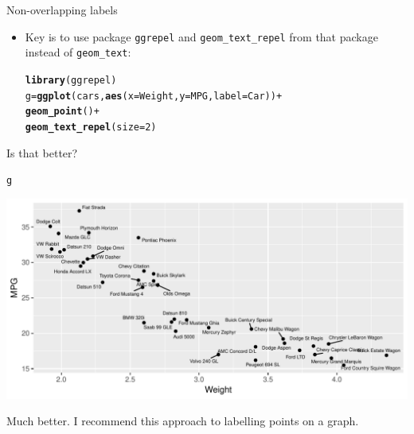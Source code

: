 \documentclass[unknownkeysallowed]{beamer}\usepackage[]{graphicx}\usepackage[]{color}
\makeatletter
\def\maxwidth{ %
  \ifdim\Gin@nat@width>\linewidth
    \linewidth
  \else
    \Gin@nat@width
  \fi
}
\newcommand{\hlnum}[1]{\textcolor[rgb]{0.686,0.059,0.569}{#1}}%
\newcommand{\hlopt}[1]{\textcolor[rgb]{0,0,0}{#1}}%
\newcommand{\hlstd}[1]{\textcolor[rgb]{0.345,0.345,0.345}{#1}}%
\newcommand{\hlkwb}[1]{\textcolor[rgb]{0.69,0.353,0.396}{#1}}%
\newcommand{\hlkwc}[1]{\textcolor[rgb]{0.333,0.667,0.333}{#1}}%
\newcommand{\hlkwd}[1]{\textcolor[rgb]{0.737,0.353,0.396}{\textbf{#1}}}%
\newenvironment{kframe}{%
 \def\at@end@of@kframe{}%
 \ifinner\ifhmode%
  \def\at@end@of@kframe{\end{minipage}}%
  \begin{minipage}{\columnwidth}%
 \fi\fi%
 \def\FrameCommand##1{\hskip\@totalleftmargin \hskip-\fboxsep
 \colorbox{shadecolor}{##1}\hskip-\fboxsep
     \hskip-\linewidth \hskip-\@totalleftmargin \hskip\columnwidth}%
 \MakeFramed {\advance\hsize-\width
   \@totalleftmargin\z@ \linewidth\hsize
   \@setminipage}}%
 {\par\unskip\endMakeFramed%
 \at@end@of@kframe}
\newenvironment{knitrout}{}{} %
\makeatother
\begin{document}
\begin{frame}[fragile]{Non-overlapping labels}
  
  \begin{itemize}
  \item Key is to use package \texttt{ggrepel} and
    \verb+geom_text_repel+ from that package instead of \verb+geom_text+:

\begin{knitrout}
\color{fgcolor}\begin{kframe}
\begin{alltt}
\hlkwd{library}\hlstd{(ggrepel)}
\hlstd{g}\hlkwb{=}\hlkwd{ggplot}\hlstd{(cars,}\hlkwd{aes}\hlstd{(}\hlkwc{x}\hlstd{=Weight,}\hlkwc{y}\hlstd{=MPG,}\hlkwc{label}\hlstd{=Car))}\hlopt{+}
  \hlkwd{geom_point}\hlstd{()}\hlopt{+}
  \hlkwd{geom_text_repel}\hlstd{(}\hlkwc{size}\hlstd{=}\hlnum{2}\hlstd{)}
\end{alltt}
\end{kframe}
\end{knitrout}
  \end{itemize}
  
\end{frame}

\begin{frame}[fragile]{Is that better?}
  
\begin{knitrout}
\color{fgcolor}\begin{kframe}
\begin{alltt}
\hlstd{g}
\end{alltt}
\end{kframe}
\includegraphics[width=\maxwidth]{figure/unnamed-chunk-408-1} 

\end{knitrout}

Much better. I recommend this approach to labelling points on a graph.
  
\end{frame}
\end{document}
